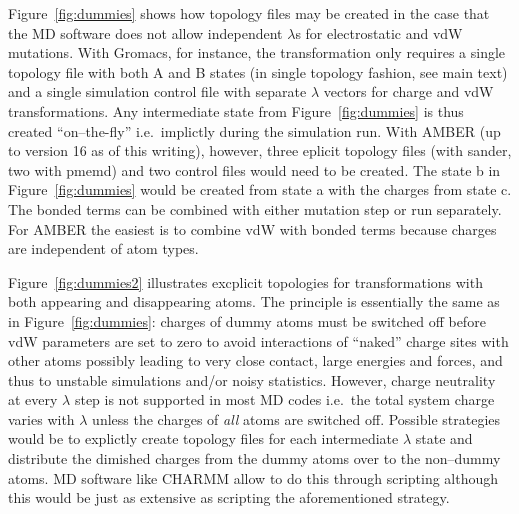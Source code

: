 \documentclass[journal=jctcce,manuscript=suppinfo]{achemso}
\begin{document}
Figure~\ref{fig:dummies} shows how topology files may be created in
the case that the MD software does not allow independent $\lambda$s
for electrostatic and vdW mutations.  With Gromacs, for instance, the
transformation only requires a single topology file with both A and B
states (in single topology fashion, see main text) and a single
simulation control file with separate $\lambda$ vectors for charge and
vdW transformations.  Any intermediate state from
Figure~\ref{fig:dummies} is thus created ``on--the-fly'' i.e.\
implictly during the simulation run.  With AMBER (up to version 16 as
of this writing), however, three eplicit topology files (with sander,
two with pmemd) and two control files would need to be created.  The
state b in Figure~\ref{fig:dummies} would be created from state a with
the charges from state c.  The bonded terms can be combined with
either mutation step or run separately.  For AMBER the easiest is to
combine vdW with bonded terms because charges are independent of atom
types.

Figure~\ref{fig:dummies2} illustrates excplicit topologies for
transformations with both appearing and disappearing atoms.  The
principle is essentially the same as in Figure~\ref{fig:dummies}:
charges of dummy atoms must be switched off before vdW parameters are
set to zero to avoid interactions of ``naked'' charge sites with other
atoms possibly leading to very close contact, large energies and
forces, and thus to unstable simulations and/or noisy statistics.
However, charge neutrality at every $\lambda$ step is not supported in
most MD codes i.e.\ the total system charge varies with $\lambda$
unless the charges of \emph{all} atoms are switched off.  Possible
strategies would be to explictly create topology files for each
intermediate $\lambda$ state and distribute the dimished charges from
the dummy atoms over to the non--dummy atoms.  MD software like CHARMM
allow to do this through scripting although this would be just as
extensive as scripting the aforementioned strategy.
\end{document}
